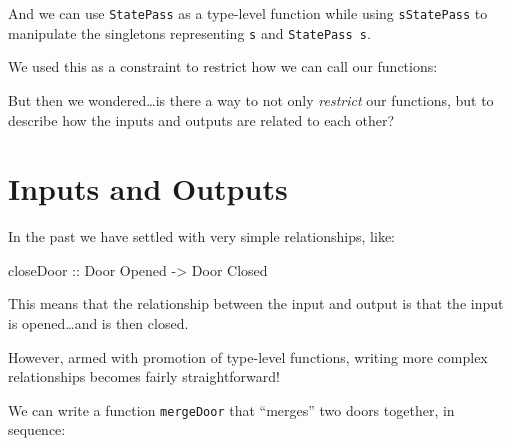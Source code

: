\documentclass[]{article}
\newenvironment{Shaded}{}{}
\newcommand{\CommentTok}[1]{\textcolor[rgb]{0.38,0.63,0.69}{\textit{#1}}}
\newcommand{\DataTypeTok}[1]{\textcolor[rgb]{0.56,0.13,0.00}{#1}}
\newcommand{\FunctionTok}[1]{\textcolor[rgb]{0.02,0.16,0.49}{#1}}
\newcommand{\NormalTok}[1]{#1}
\newcommand{\OperatorTok}[1]{\textcolor[rgb]{0.40,0.40,0.40}{#1}}
\newcommand{\OtherTok}[1]{\textcolor[rgb]{0.00,0.44,0.13}{#1}}
\newcommand{\StringTok}[1]{\textcolor[rgb]{0.25,0.44,0.63}{#1}}
\begin{document}
And we can use \texttt{StatePass} as a type-level function while using
\texttt{sStatePass} to manipulate the singletons representing \texttt{s} and
\texttt{StatePass\ s}.

We used this as a constraint to restrict how we can call our functions:

\begin{Shaded}
\end{Shaded}

But then we wondered\ldots is there a way to not only \emph{restrict} our
functions, but to describe how the inputs and outputs are related to each other?

\section{Inputs and Outputs}\label{inputs-and-outputs}

In the past we have settled with very simple relationships, like:

\begin{Shaded}
\begin{Highlighting}[]
\OtherTok{closeDoor ::} \DataTypeTok{Door} \DataTypeTok{\textquotesingle{}Opened} \OtherTok{{-}\textgreater{}} \DataTypeTok{Door} \DataTypeTok{\textquotesingle{}Closed}
\end{Highlighting}
\end{Shaded}

This means that the relationship between the input and output is that the input
is opened\ldots and is then closed.

However, armed with promotion of type-level functions, writing more complex
relationships becomes fairly straightforward!

We can write a function \texttt{mergeDoor} that ``merges'' two doors together,
in sequence:
\end{document}
